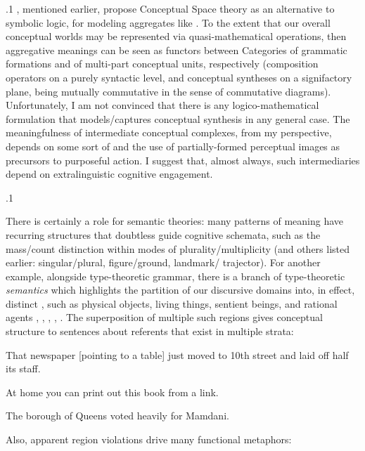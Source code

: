 \documentclass[11pt, twocolumn]{article}
\begin{document}
{{\p.1{%
\Boltetal{}, mentioned earlier, propose Conceptual Space theory
as an alternative to symbolic logic, for modeling
aggregates like \redplusbox{}. To the extent that
our overall conceptual worlds may be represented via
quasi-mathematical operations, then aggregative meanings
can be seen as functors between Categories of grammatic
formations and of multi-part conceptual units, respectively
(composition operators on a purely syntactic level,
and conceptual syntheses on a signifactory plane,
being mutually commutative in the sense of
commutative diagrams). Unfortunately, I am not
convinced that there is any logico-mathematical
formulation that models/captures conceptual
synthesis in any general case. The meaningfulness
of intermediate conceptual complexes, from my
perspective, depends on some sort of
 and the use of partially-formed
perceptual images as precursors to purposeful action.
I suggest that, almost always, such intermediaries
depend on extralinguistic cognitive engagement.
}%

\p.1{%
There is certainly a role for semantic theories:
many patterns of meaning have recurring structures
that doubtless guide cognitive schemata,
such as the mass/count distinction within modes
of plurality/multiplicity (and others listed earlier:
singular/plural, figure/ground, landmark/ trajector).
For another example, alongside type-theoretic
grammar, there is a branch of type-theoretic
\textit{semantics} which highlights the partition
of our discursive domains into, in effect,
distinct , such as
physical objects, living things, sentient
beings, and rational agents , ,
, ,
. The superposition of
multiple such regions gives conceptual structure
to sentences about referents that exist in multiple strata:

\begin{exsGroup}

\exsItem{}  That newspaper [pointing to a table] just moved to 10th street
and laid off half its staff.

\exsItem{}  At home you can print out this book from a  link.

\exsItem{}  The borough of Queens voted heavily for Mamdani.\vspace{2pt}

\end{exsGroup}

\nip{}%
Also, apparent region violations drive many functional metaphors:

}}}
\end{document}
